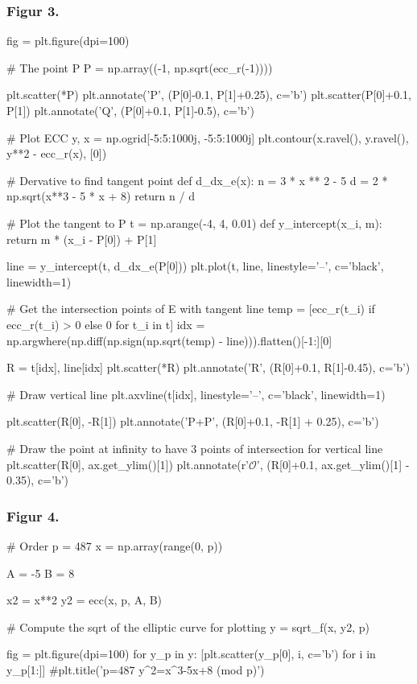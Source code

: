 \subsubsection{Figur 3.}
\label{section:figur_3}
\begin{python}
fig = plt.figure(dpi=100)

# The point P
P = np.array((-1, np.sqrt(ecc_r(-1))))

plt.scatter(*P)
plt.annotate('P', (P[0]-0.1, P[1]+0.25), c='b')
plt.scatter(P[0]+0.1, P[1])
plt.annotate('Q', (P[0]+0.1, P[1]-0.5), c='b')


# Plot ECC
y, x = np.ogrid[-5:5:1000j, -5:5:1000j]
plt.contour(x.ravel(), y.ravel(), y**2 - ecc_r(x), [0])

# Dervative to find tangent point
def d_dx_e(x):
    n = 3 * x ** 2 - 5
    d = 2 * np.sqrt(x**3 - 5 * x + 8)
    return n / d

# Plot the tangent to P
t = np.arange(-4, 4, 0.01)
def y_intercept(x_i, m):
    return m * (x_i - P[0]) + P[1]

line = y_intercept(t, d_dx_e(P[0]))
plt.plot(t, line, linestyle='--', c='black', linewidth=1)

# Get the intersection points of E with tangent line
temp = [ecc_r(t_i) if ecc_r(t_i) > 0 else 0 for t_i in t]
idx = np.argwhere(np.diff(np.sign(np.sqrt(temp) - line))).flatten()[-1:][0]

R = t[idx], line[idx]
plt.scatter(*R)
plt.annotate('R', (R[0]+0.1, R[1]-0.45), c='b')

# Draw vertical line
plt.axvline(t[idx], linestyle='--', c='black', linewidth=1)

plt.scatter(R[0], -R[1])
plt.annotate('P+P', (R[0]+0.1, -R[1] + 0.25), c='b')


# Draw the point at infinity to have 3 points of intersection for vertical line
plt.scatter(R[0], ax.get_ylim()[1])
plt.annotate(r'$\mathcal{O}$', (R[0]+0.1, ax.get_ylim()[1] - 0.35), c='b')
\end{python}

\subsubsection{Figur 4.}
\label{section:figur_4}
\begin{python}
# Order
p = 487
x = np.array(range(0, p))

A = -5
B = 8

x2 = x**2 %
y2 = ecc(x, p, A, B)

# Compute the sqrt of the elliptic curve for plotting
y = sqrt_f(x, y2, p)

fig = plt.figure(dpi=100)
for y_p in y:
    [plt.scatter(y_p[0], i, c='b') for i in y_p[1:]]
#plt.title('p=487   y^2=x^3-5x+8 (mod p)')
\end{python}

